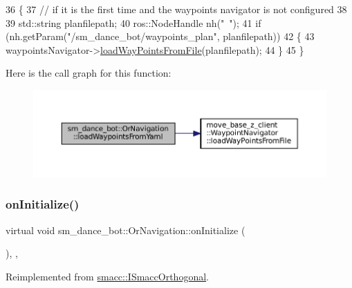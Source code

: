 \begin{DoxyCode}
36     \{
37         \textcolor{comment}{// if it is the first time and the waypoints navigator is not configured}
38 
39         std::string planfilepath;
40         ros::NodeHandle nh(\textcolor{stringliteral}{"~"});
41         \textcolor{keywordflow}{if} (nh.getParam(\textcolor{stringliteral}{"/sm\_dance\_bot/waypoints\_plan"}, planfilepath))
42         \{
43             waypointsNavigator->\hyperlink{classmove__base__z__client_1_1WaypointNavigator_af56d146945280a8660805aad7eb3aed9}{loadWayPointsFromFile}(planfilepath);
44         \}
45     \}
\end{DoxyCode}
Here is the call graph for this function\+:
\nopagebreak
\begin{figure}[H]
\begin{center}
\leavevmode
\includegraphics[width=350pt]{classsm__dance__bot_1_1OrNavigation_a1f092ffe3a1b29ae9ea6623aff00ab16_cgraph}
\end{center}
\end{figure}
\mbox{\label{classsm__dance__bot_1_1OrNavigation_a9f87c78f5af67024c9eda25097a135ac}} 
\subsubsection{\texorpdfstring{on\+Initialize()}{onInitialize()}}
{\footnotesize\ttfamily virtual void sm\+\_\+dance\+\_\+bot\+::\+Or\+Navigation\+::on\+Initialize (\begin{DoxyParamCaption}{ }\end{DoxyParamCaption})\hspace{0.3cm}{\ttfamily [inline]}, {\ttfamily [override]}, {\ttfamily [virtual]}}



Reimplemented from \hyperlink{classsmacc_1_1ISmaccOrthogonal_a6bb31c620cb64dd7b8417f8705c79c7a}{smacc\+::\+I\+Smacc\+Orthogonal}.



